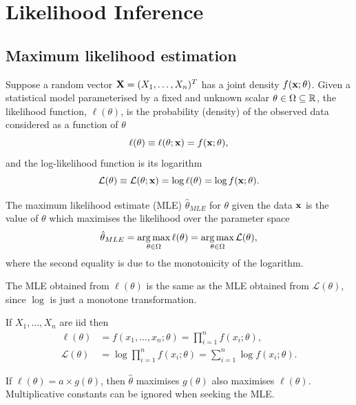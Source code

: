 \documentclass[10pt, a4paper]{article}
\begin{document}
\newpage

\section{Likelihood Inference}

\subsection{Maximum likelihood estimation}

\begin{definition}[Likelihood]
    Suppose a random vector $\mathbf{X} = (X_1, \dotsc, X_n) ^ T$ has a joint density $f(\mathbf{x}; \theta)$.
    Given a statistical model parameterised by a fixed and unknown scalar $\theta \in \Omega \subseteq \mathbb{R}$,
    the likelihood function,
    $\ell(\theta)$,
    is the probability
    (density)
    of the observed data considered as a function of $\theta$
    \[
    \ell(\theta) \equiv \ell(\theta; \mathbf{x}) = f(\mathbf{x}; \theta),
    \]
    and the log-likelihood function is its logarithm
    \[
    \mathcal{L}(\theta) \equiv \mathcal{L}(\theta; \mathbf{x}) = \log{\ell(\theta)} = \log{f(\mathbf{x}; \theta)}.
    \]
\end{definition}

\begin{definition}
    The maximum likelihood estimate
    (MLE)
    $\hat{\theta}_{MLE}$ for $\theta$ given the data $\mathbf{x}$ is the value of $\theta$ which maximises the likelihood over the parameter space
    \[
    \hat{\theta}_{MLE} = \operatorname*{arg\,max}_{\theta \in \Omega}\ell(\theta) = \operatorname*{arg\,max}_{\theta \in \Omega}\mathcal{L}(\theta),
    \]
    where the second equality is due to the monotonicity of the logarithm.
\end{definition}


The MLE obtained from $\ell(\theta)$ is the same as the MLE obtained from $\mathcal{L}(\theta)$,
since $\log$ is just a monotone transformation.

If $X_1, \dotsc, X_n$ are iid then
\begin{align*}
    \ell(\theta) &= f(x_1, \dotsc, x_n; \theta) = \prod_{i = 1}^{n}f(x_i; \theta), \\
    \mathcal{L}(\theta) &= \log{\prod_{i = 1}^{n}f(x_i; \theta)} = \sum_{i = 1}^{n}\log{f(x_i; \theta)}.
\end{align*}

If $\ell(\theta) = a \times g(\theta)$,
then $\hat{\theta}$ maximises $g(\theta)$ also maximises $\ell(\theta)$.
Multiplicative constants can be ignored when seeking the MLE.
\end{document}
